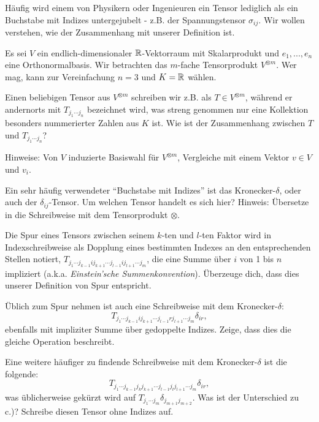 \begin{sheet}
\begin{problem}[title={Aber Tensoren sind doch so Buchstaben mit Indizes}]
	\label{ex:TensorenMitIndizes}
	Häufig wird einem von Physikern oder Ingenieuren ein Tensor lediglich als ein Buchstabe mit Indizes untergejubelt - z.B. der Spannungstensor $\sigma_{ij}$. Wir wollen verstehen, wie der Zusammenhang mit unserer Definition ist.

	Es sei $V$ ein endlich-dimensionaler $\mathbb{R}$-Vektorraum mit Skalarprodukt und $e_1, ..., e_n$ eine Orthonormalbasis. Wir betrachten das $m$-fache Tensorprodukt $V^{\otimes m}$. Wer mag, kann zur Vereinfachung $n=3$ und $K=\mathbb{R}$ wählen.
	\begin{subproblem}
		Einen beliebigen Tensor aus $V^{\otimes m}$ schreiben wir z.B. als $T\in V^{\otimes m}$, während er andernorts mit $T_{j_1 \cdots j_n}$ bezeichnet wird, was streng genommen nur eine Kollektion besonders nummerierter Zahlen aus $K$ ist. Wie ist der Zusammenhang zwischen $T$ und $T_{j_1 \cdots j_n}$?

		Hinweise: Von $V$ induzierte Basiswahl für $V^{\otimes m}$, Vergleiche mit einem Vektor $v\in V$ und $v_i$.
	\end{subproblem}
	\begin{subproblem}
		Ein sehr häufig verwendeter \enquote{Buchstabe mit Indizes} ist das Kronecker-$\delta$, oder auch der $\delta_{ij}$-Tensor.
		Um welchen Tensor handelt es sich hier?
		Hinweis: Übersetze in die Schreibweise mit dem Tensorprodukt $\otimes$.
	\end{subproblem}
	\begin{subproblem}
		Die Spur eines Tensors zwischen seinem $k$-ten und $l$-ten Faktor wird in Indexschreibweise als Dopplung eines bestimmten Indexes an den entsprechenden Stellen notiert, $T_{j_1\cdots j_{k-1} i j_{k+1} \cdots j_{l-1} i j_{l+1}  \cdots j_m}$, die eine Summe über $i$ von 1 bis $n$ impliziert (a.k.a. \emph{Einstein'sche Summenkonvention}). Überzeuge dich, dass dies unserer Definition von Spur entspricht.

		Üblich zum Spur nehmen ist auch eine Schreibweise mit dem Kronecker-$\delta$: \[T_{j_1\cdots j_{k-1} i j_{k+1} \cdots j_{l-1} r j_{l+1}  \cdots j_m} \delta_{ir},\] ebenfalls mit impliziter Summe über gedoppelte Indizes. Zeige, dass dies die gleiche Operation beschreibt.
	\end{subproblem}
	\begin{subproblem}
		Eine weitere häufiger zu findende Schreibweise mit dem Kronecker-$\delta$ ist die folgende:
		\[T_{j_1\cdots j_{k-1} j_{k} j_{k+1} \cdots j_{l-1} j_l j_{l+1}  \cdots j_m} \delta_{ir},\]
		was üblicherweise gekürzt wird auf $T_{j_1\cdots j_m} \delta_{j_{m+1} j_{m+2}}$. Was ist der Unterschied zu c.)? Schreibe diesen Tensor ohne Indizes auf.
	\end{subproblem}
\end{problem}


\end{sheet}
